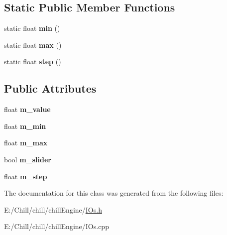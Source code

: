 \subsection*{Static Public Member Functions}
\begin{DoxyCompactItemize}
\item 
\mbox{\label{class_chill_1_1_scalar_input_a515f5392e0c9812016c02946962556b2}} 
static float {\bfseries min} ()
\item 
\mbox{\label{class_chill_1_1_scalar_input_a743cd85e03e89b7f53fc4e26c67d1f66}} 
static float {\bfseries max} ()
\item 
\mbox{\label{class_chill_1_1_scalar_input_a0520246200ea1b91d6a34a557caccdb3}} 
static float {\bfseries step} ()
\end{DoxyCompactItemize}
\subsection*{Public Attributes}
\begin{DoxyCompactItemize}
\item 
\mbox{\label{class_chill_1_1_scalar_input_aef0a669894ff4b15e90d9b23859dcff7}} 
float {\bfseries m\+\_\+value}
\item 
\mbox{\label{class_chill_1_1_scalar_input_ab158a71d4b678f658a64f5bf0b9f0326}} 
float {\bfseries m\+\_\+min}
\item 
\mbox{\label{class_chill_1_1_scalar_input_a187136386ed53230fd19f03af361597c}} 
float {\bfseries m\+\_\+max}
\item 
\mbox{\label{class_chill_1_1_scalar_input_a0158b8840549aa1dc67e23d342349688}} 
bool {\bfseries m\+\_\+slider}
\item 
\mbox{\label{class_chill_1_1_scalar_input_aab5578149786d972a89303ad5a9bdd6c}} 
float {\bfseries m\+\_\+step}
\end{DoxyCompactItemize}


The documentation for this class was generated from the following files\+:\begin{DoxyCompactItemize}
\item 
E\+:/\+Chill/chill/chill\+Engine/\mbox{\hyperlink{_i_os_8h}{I\+Os.\+h}}\item 
E\+:/\+Chill/chill/chill\+Engine/I\+Os.\+cpp\end{DoxyCompactItemize}
